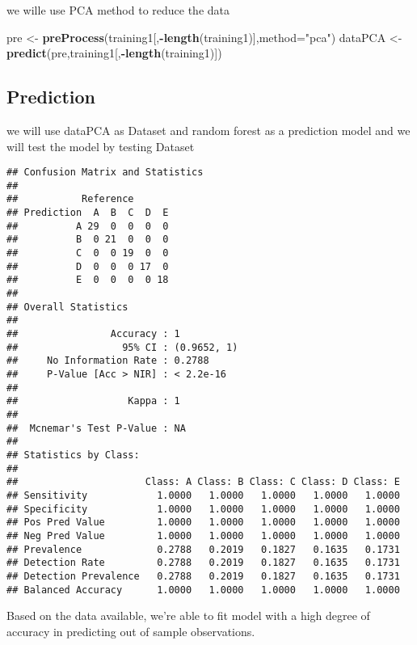 \documentclass[
]{article}
\newenvironment{Shaded}{\begin{snugshade}}{\end{snugshade}}
\newcommand{\DataTypeTok}[1]{\textcolor[rgb]{0.13,0.29,0.53}{#1}}
\newcommand{\KeywordTok}[1]{\textcolor[rgb]{0.13,0.29,0.53}{\textbf{#1}}}
\newcommand{\NormalTok}[1]{#1}
\newcommand{\OperatorTok}[1]{\textcolor[rgb]{0.81,0.36,0.00}{\textbf{#1}}}
\newcommand{\StringTok}[1]{\textcolor[rgb]{0.31,0.60,0.02}{#1}}
\begin{document}
we wille use PCA method to reduce the data

\begin{Shaded}
\begin{Highlighting}[]
\NormalTok{pre <-}\StringTok{ }\KeywordTok{preProcess}\NormalTok{(training1[,}\OperatorTok{-}\KeywordTok{length}\NormalTok{(training1)],}\DataTypeTok{method=}\StringTok{"pca"}\NormalTok{)}
\NormalTok{dataPCA <-}\StringTok{ }\KeywordTok{predict}\NormalTok{(pre,training1[,}\OperatorTok{-}\KeywordTok{length}\NormalTok{(training1)])}
\end{Highlighting}
\end{Shaded}

\hypertarget{prediction}{%
\subsection{Prediction}\label{prediction}}

we will use dataPCA as Dataset and random forest as a prediction model
and we will test the model by testing Dataset

\begin{Shaded}
\end{Shaded}

\begin{verbatim}
## Confusion Matrix and Statistics
## 
##           Reference
## Prediction  A  B  C  D  E
##          A 29  0  0  0  0
##          B  0 21  0  0  0
##          C  0  0 19  0  0
##          D  0  0  0 17  0
##          E  0  0  0  0 18
## 
## Overall Statistics
##                                      
##                Accuracy : 1          
##                  95% CI : (0.9652, 1)
##     No Information Rate : 0.2788     
##     P-Value [Acc > NIR] : < 2.2e-16  
##                                      
##                   Kappa : 1          
##                                      
##  Mcnemar's Test P-Value : NA         
## 
## Statistics by Class:
## 
##                      Class: A Class: B Class: C Class: D Class: E
## Sensitivity            1.0000   1.0000   1.0000   1.0000   1.0000
## Specificity            1.0000   1.0000   1.0000   1.0000   1.0000
## Pos Pred Value         1.0000   1.0000   1.0000   1.0000   1.0000
## Neg Pred Value         1.0000   1.0000   1.0000   1.0000   1.0000
## Prevalence             0.2788   0.2019   0.1827   0.1635   0.1731
## Detection Rate         0.2788   0.2019   0.1827   0.1635   0.1731
## Detection Prevalence   0.2788   0.2019   0.1827   0.1635   0.1731
## Balanced Accuracy      1.0000   1.0000   1.0000   1.0000   1.0000
\end{verbatim}

Based on the data available, we're able to fit model with a high degree
of accuracy in predicting out of sample observations.
\end{document}
